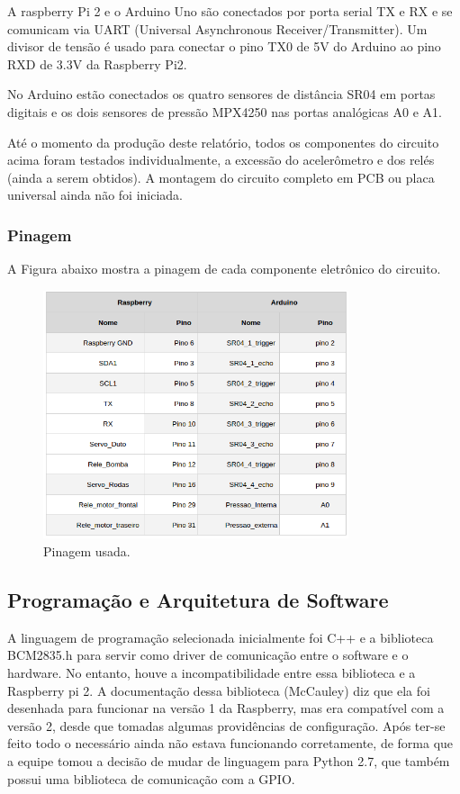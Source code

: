 A raspberry Pi 2 e o Arduino Uno são conectados por porta serial TX e RX e se comunicam via UART (Universal Asynchronous Receiver/Transmitter). Um divisor de tensão é usado para conectar o pino TX0 de 5V do Arduino ao pino RXD de 3.3V da Raspberry Pi2.

No Arduino estão conectados os quatro sensores de distância SR04 em portas digitais e os dois sensores de pressão MPX4250 nas portas analógicas A0 e A1.

Até o momento da produção deste relatório, todos os componentes do circuito acima foram testados individualmente, a excessão do acelerômetro e dos relés (ainda a serem obtidos). A montagem do circuito completo em PCB ou placa universal ainda não foi iniciada.

\subsubsection{Pinagem}
A Figura abaixo mostra a pinagem de cada componente eletrônico do circuito.
\par
\begin{figure}[h]
  \centering
  \includegraphics[width=0.8\textwidth]{figures/pinout.png}
  \caption{Pinagem usada.}
  \label{fig:pinout}
\end{figure}
\FloatBarrier
\par

\subsection{Programação e Arquitetura de Software}
A linguagem de programação selecionada inicialmente foi C++ e a biblioteca BCM2835.h para servir como driver de comunicação entre o software e o hardware. No entanto, houve a incompatibilidade entre essa biblioteca e a Raspberry pi 2. A documentação dessa biblioteca (McCauley) diz que ela foi desenhada para funcionar na versão 1 da Raspberry, mas era compatível com a versão 2, desde que tomadas algumas providências de configuração. Após ter-se feito todo o necessário ainda não estava funcionando corretamente, de forma que a equipe tomou a decisão de mudar de linguagem para Python 2.7, que também possui uma biblioteca de comunicação com a GPIO.

